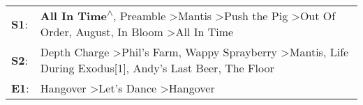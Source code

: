 \begin{supertabular}{p{0.03\textwidth}p{0.92\textwidth}}
 \textbf{S1}:  &  \textbf{All In Time\textsuperscript{$\wedge$}}, \enspace Preamble\textsuperscript{} \textgreater \enspace Mantis\textsuperscript{} \textgreater \enspace Push the Pig\textsuperscript{} \textgreater \enspace Out Of Order\textsuperscript{}, \enspace August\textsuperscript{}, \enspace In Bloom\textsuperscript{} \textgreater \enspace All In Time\textsuperscript{}  \enspace  \\
 \textbf{S2}:  &                                                       Depth Charge\textsuperscript{} \textgreater \enspace Phil's Farm\textsuperscript{}, \enspace Wappy Sprayberry\textsuperscript{} \textgreater \enspace Mantis\textsuperscript{}, \enspace Life During Exodus[1]\textsuperscript{}, \enspace Andy's Last Beer\textsuperscript{}, \enspace The Floor\textsuperscript{}  \enspace  \\
 \textbf{E1}:  &                                                                                                                                                                                                                                           Hangover\textsuperscript{} \textgreater \enspace Let's Dance\textsuperscript{} \textgreater \enspace Hangover\textsuperscript{}  \enspace  \\
\end{supertabular}
